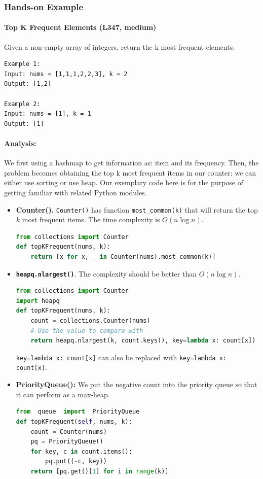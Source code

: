 \documentclass[../main.tex]{subfiles}
\begin{document}
\subsubsection{Hands-on Example}
\paragraph{Top K Frequent Elements (L347, medium)} Given a non-empty array of integers, return the k most frequent elements.
\begin{lstlisting}[numbers=none]
Example 1:
Input: nums = [1,1,1,2,2,3], k = 2
Output: [1,2]

Example 2:
Input: nums = [1], k = 1
Output: [1]
\end{lstlisting}

\paragraph{Analysis:} We first using a hashmap to get information as: item and its frequency. Then, the problem becomes obtaining the top k most frequent items in our counter: we can either use sorting or use heap. Our exemplary code here is for the purpose of getting familiar with related Python modules.
\begin{itemize}
    \item \textbf{Counter().} \texttt{Counter()} has function \texttt{most\_common(k)} that will return the top $k$ most frequent items. The time complexity is $O(n \log n)$. 
\begin{lstlisting}[language=Python]
from collections import Counter
def topKFrequent(nums, k):
    return [x for x, _ in Counter(nums).most_common(k)]
\end{lstlisting}

\item \textbf{\texttt{heapq.nlargest()}}. The complexity should be better than $O(n \log n)$. 
\begin{lstlisting}[language=Python]
from collections import Counter
import heapq
def topKFrequent(nums, k):
    count = collections.Counter(nums) 
    # Use the value to compare with
    return heapq.nlargest(k, count.keys(), key=lambda x: count[x]) 
\end{lstlisting}
\texttt{key=lambda x: count[x]} can also be replaced with \texttt{key=lambda x: count[x]}.

\item \textbf{PriorityQueue():} We put the negative count into the priority queue so that it can perform as a max-heap. 
\begin{lstlisting}[language=Python]
from  queue  import  PriorityQueue
def topKFrequent(self, nums, k):
    count = Counter(nums)
    pq = PriorityQueue()
    for key, c in count.items():
        pq.put((-c, key))
    return [pq.get()[1] for i in range(k)]
\end{lstlisting}
\end{itemize}
\end{document}
